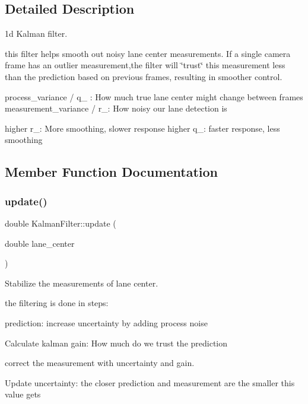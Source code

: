 \subsection{Detailed Description}
1d Kalman filter. 

this filter helps smooth out noisy lane center measurements. If a single camera frame has an outlier measurement,the filter will \char`\"{}trust\char`\"{} this measurement less than the prediction based on previous frames, resulting in smoother control.

process\+\_\+variance / q\+\_\+ \+: How much true lane center might change between frames measurement\+\_\+variance / r\+\_\+\+: How noisy our lane detection is

higher r\+\_\+\+: More smoothing, slower response higher q\+\_\+\+: faster response, less smoothing 

\subsection{Member Function Documentation}
\mbox{\label{classKalmanFilter_ae57452f04b28846c9b68c5887eafa00e}} 
\subsubsection{\texorpdfstring{update()}{update()}}
{\footnotesize\ttfamily double Kalman\+Filter\+::update (\begin{DoxyParamCaption}\item[{double}]{lane\+\_\+center }\end{DoxyParamCaption})}



Stabilize the measurements of lane center. 

the filtering is done in steps\+:
\begin{DoxyItemize}
\item prediction\+: increase uncertainty by adding process noise
\item Calculate kalman gain\+: How much do we trust the prediction
\item correct the measurement with uncertainty and gain.
\item Update uncertainty\+: the closer prediction and measurement are the smaller this value gets
\end{DoxyItemize}


